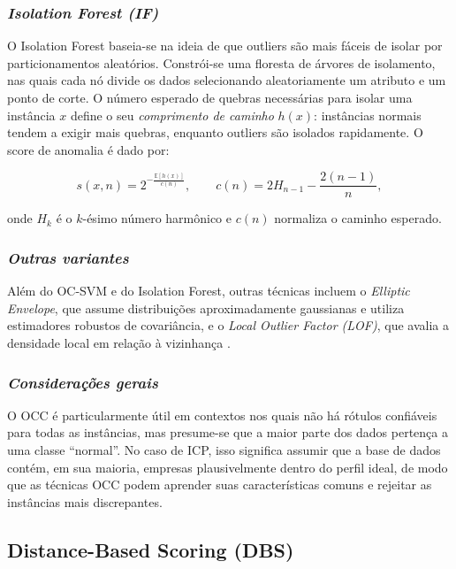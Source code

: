 \subsubsection{\textit{Isolation Forest (IF)}}

O Isolation Forest \cite{liu2008isolation} baseia-se na ideia de que outliers
são mais fáceis de isolar por particionamentos aleatórios. Constrói-se
uma floresta de árvores de isolamento, nas quais cada nó divide os dados
selecionando aleatoriamente um atributo e um ponto de corte. O número
esperado de quebras necessárias para isolar uma instância $x$ define o
seu \textit{comprimento de caminho} $h(x)$: instâncias normais tendem a exigir
mais quebras, enquanto outliers são isolados rapidamente. O score de
anomalia é dado por:

\begin{equation}
s(x,n) = 2^{-\frac{\mathbb{E}[h(x)]}{c(n)}}, \qquad
c(n) = 2H_{n-1} - \frac{2(n-1)}{n},
\end{equation}

onde $H_k$ é o $k$-ésimo número harmônico e $c(n)$ normaliza o caminho
esperado.

\subsubsection{\textit{Outras variantes}}

Além do OC-SVM e do Isolation Forest, outras técnicas incluem o
\textit{Elliptic Envelope}, que assume distribuições aproximadamente gaussianas
e utiliza estimadores robustos de covariância, e o \textit{Local Outlier Factor
(LOF)}, que avalia a densidade local em relação à vizinhança \cite{chandola2009anomaly}.

\subsubsection{\textit{Considerações gerais}}

O OCC é particularmente útil em contextos nos quais não há rótulos
confiáveis para todas as instâncias, mas presume-se que a maior parte
dos dados pertença a uma classe ``normal''. No caso de ICP, isso significa
assumir que a base de dados contém, em sua maioria, empresas
plausivelmente dentro do perfil ideal, de modo que as técnicas OCC podem
aprender suas características comuns e rejeitar as instâncias mais
discrepantes.



\subsection{\textbf{Distance-Based Scoring (DBS)}}

